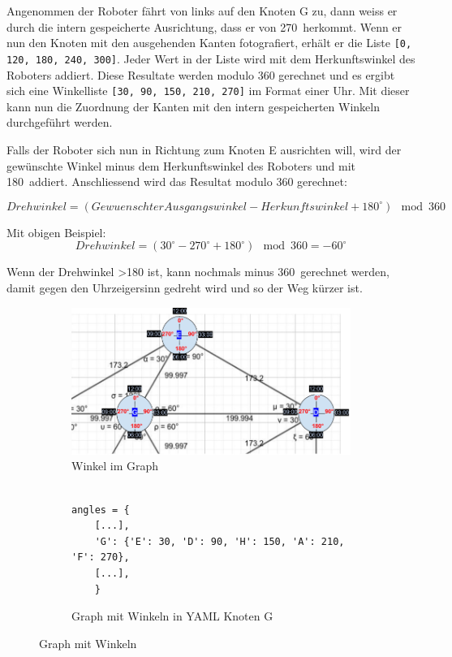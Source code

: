Angenommen der Roboter fährt von links auf den Knoten G zu, dann weiss er durch die intern gespeicherte Ausrichtung, dass er von 270\textdegree\ herkommt. Wenn er nun den Knoten mit den ausgehenden Kanten fotografiert, erhält er die Liste \verb|[0, 120, 180, 240, 300]|.  Jeder Wert in der Liste wird mit dem Herkunftswinkel des Roboters addiert. Diese Resultate werden modulo 360 gerechnet und es ergibt sich eine Winkelliste \verb|[30, 90, 150, 210, 270]| im Format einer Uhr. Mit dieser kann nun die Zuordnung der Kanten mit den intern gespeicherten Winkeln durchgeführt werden.

Falls der Roboter sich nun in Richtung zum Knoten E ausrichten will, wird der gewünschte Winkel minus dem Herkunftswinkel des Roboters und mit 180\textdegree\ addiert. Anschliessend wird das Resultat modulo 360 gerechnet:

\[Drehwinkel = (GewuenschterAusgangswinkel - Herkunftswinkel + 180^\circ) \mod 360\]

Mit obigen Beispiel:
\[Drehwinkel = (30^\circ - 270^\circ + 180^\circ) \mod 360 = -60^\circ\]

Wenn der Drehwinkel >180 ist, kann nochmals minus 360\textdegree\ gerechnet werden, damit gegen den Uhrzeigersinn gedreht wird und so der Weg kürzer ist.


\begin{figure}[H]
\centering
\begin{subfigure}{0.98\textwidth}
\centering
\includegraphics[width=0.95\linewidth]{assets/informatik-prototyp/simulator/internal-angles.png} 
\caption{Winkel im Graph}
\label{fig:labeled-graph-angles}
\end{subfigure}
\begin{subfigure}{0.8\textwidth}
\begin{footnotesize}
\begin{verbatim}

angles = {
    [...],
    'G': {'E': 30, 'D': 90, 'H': 150, 'A': 210, 'F': 270},
    [...],
    }
\end{verbatim}
\end{footnotesize}
\caption{Graph mit Winkeln in YAML Knoten G}
\label{fig:graph-yaml-angle}
\end{subfigure}
\caption{Graph mit Winkeln}
\label{fig:angle-graphs-internal}
\end{figure}

